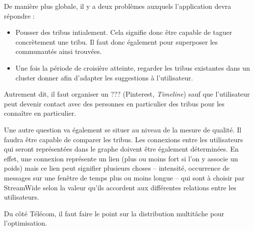 \documentclass[a4paper]{article}
\begin{document}
De manière plus globale, il y a deux problèmes auxquels l'application devra
répondre :
\begin{itemize}
    \item Pousser des tribus intialement. Cela signifie donc être capable de
        taguer concrètement une tribu. Il faut donc également pour superposer
        les communautés ainsi trouvées.
    \item Une fois la période de croisière atteinte, regarder les tribus
        existantes dans un cluster donner afin d'adapter les suggestions à
        l'utilisateur.
\end{itemize}

Autrement dit, il faut organiser un ??? (Pinterest, \emph{Timeline}) sauf que
l'utilisateur peut devenir contact avec des personnes en particulier des tribus
pour les connaître en particulier.

Une autre question va également se situer au niveau de la mesure de qualité. Il
faudra être capable de comparer les tribus. Les connexions entre les
utilisateurs qui seront représentées dans le graphe doivent être également
déterminées. En effet, une connexion représente un lien (plus ou moins fort si
l'on y associe un poids) mais ce lien peut signifier plusieurs choses --
intensité, occurrence de messages sur une fenêtre de temps plus ou moins longue
-- qui sont à choisir par StreamWide selon la valeur qu'ils accordent aux
différentes relations entre les utilisateurs.

Du côté Télécom, il faut faire le point sur la distribution multit\^ache pour
l'optimisation.
\end{document}
